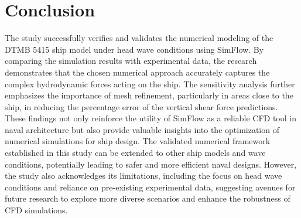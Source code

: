 \documentclass[12pt]{article} %
\begin{document}
\section{Conclusion}
The study successfully verifies and validates the numerical modeling of the DTMB 5415 ship model under head wave conditions using SimFlow. By comparing the simulation results with experimental data, the research demonstrates that the chosen numerical approach accurately captures the complex hydrodynamic forces acting on the ship. The sensitivity analysis further emphasizes the importance of mesh refinement, particularly in areas close to the ship, in reducing the percentage error of the vertical shear force predictions. These findings not only reinforce the utility of SimFlow as a reliable CFD tool in naval architecture but also provide valuable insights into the optimization of numerical simulations for ship design. The validated numerical framework established in this study can be extended to other ship models and wave conditions, potentially leading to safer and more efficient naval designs. However, the study also acknowledges its limitations, including the focus on head wave conditions and reliance on pre-existing experimental data, suggesting avenues for future research to explore more diverse scenarios and enhance the robustness of CFD simulations.
\end{document}
